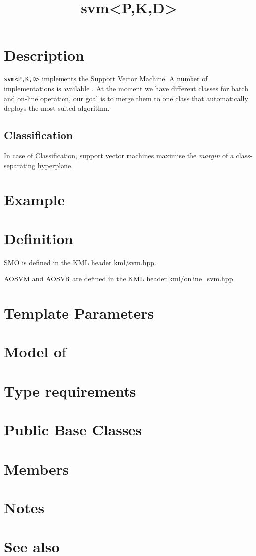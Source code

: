 \documentclass{article}
\begin{document}
\title{svm<P,K,D>}
\maketitle

\section*{Description}

\texttt{svm<P,K,D>} implements the Support Vector Machine. A number of implementations
is available \cite{cauwenberghs00incremental,platt99fast,engel02sparse,ma03accurate}. At the moment we have
different classes for batch and on-line operation, our goal is to 
merge them to one class that automatically deploys the most suited algorithm. 


\subsection*{Classification}

In case of \href{\kmlroot/reference/classification.html}{Classification}, 
support vector machines maximise the \emph{margin} of a class-separating
hyperplane. 




\section*{Example}
\section*{Definition}


SMO is defined in the KML header \href{\kmlsvnroot/kml/svm.hpp}{kml/svm.hpp}.

\noindent AOSVM and AOSVR are defined in the KML header \href{\kmlsvnroot/kml/online_svm.hpp}{kml/online_svm.hpp}.

\section*{Template Parameters}
\section*{Model of}
\section*{Type requirements}
\section*{Public Base Classes}
\section*{Members}
\section*{Notes}
\section*{See also}



\end{document}
